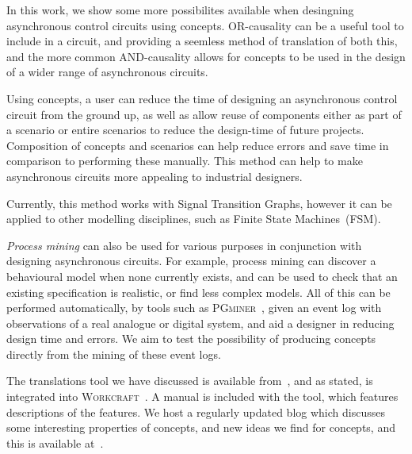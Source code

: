\documentclass[british,conference,compsoc]{IEEEtran}
\newcommand{\noun}[1]{\textsc{#1}}
\begin{document}
In this work, we show some more possibilites available when desingning
asynchronous control circuits using concepts. OR-causality can be a
useful tool to include in a circuit, and providing a seemless method
of translation of both this, and the more common AND-causality allows
for concepts to be used in the design of a wider range of asynchronous 
circuits.

Using concepts, a user can reduce the time of designing an asynchronous
control circuit from the ground up, as well as allow reuse of components
either as part of a scenario or entire scenarios to reduce the design-time
of future projects. Composition of concepts and scenarios can help
reduce errors and save time in comparison to performing these manually.
This method can help to make asynchronous circuits more appealing
to industrial designers.

Currently, this method works with Signal Transition Graphs, however
it can be applied to other modelling disciplines, such as Finite State
Machines~(FSM).

\emph{Process mining} can also be used for various purposes in conjunction
with designing asynchronous circuits. For example, process mining can discover
a behavioural model when none currently exists, and can be used to check 
that an existing specification is realistic, or find less complex models. 
All of this can be performed automatically, by tools such as
\noun{PGminer}~\cite{mokhov2016mining}, given
an event log with observations of a real analogue or digital system, and aid a
designer in reducing design time and errors. We aim to test the possibility of producing
concepts directly from the mining of these event logs.

The translations tool we have discussed is available from~\cite{2016_concepts_github},
and as stated, is integrated into \noun{Workcraft}~\cite{Workcraft_website}. 
A manual is included with the tool, which features descriptions of the features. 
We host a regularly updated blog which discusses some interesting properties
of concepts, and new ideas we find for concepts, and this is available 
at~\cite{2016_blog_concepts}.


\end{document}
